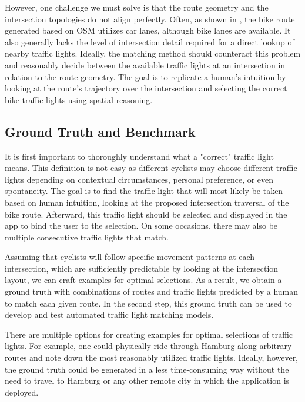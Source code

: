 However, one challenge we must solve is that the route geometry and the intersection topologies do not align perfectly. Often, as shown in , the bike route generated based on OSM utilizes car lanes, although bike lanes are available. It also generally lacks the level of intersection detail required for a direct lookup of nearby traffic lights. Ideally, the matching method should counteract this problem and reasonably decide between the available traffic lights at an intersection in relation to the route geometry. The goal is to replicate a human's intuition by looking at the route's trajectory over the intersection and selecting the correct bike traffic lights using spatial reasoning.

\subsection{Ground Truth and Benchmark}

It is first important to thoroughly understand what a "correct" traffic light means. This definition is not easy as different cyclists may choose different traffic lights depending on contextual circumstances, personal preference, or even spontaneity. The goal is to find the traffic light that will most likely be taken based on human intuition, looking at the proposed intersection traversal of the bike route. Afterward, this traffic light should be selected and displayed in the app to bind the user to the selection. On some occasions, there may also be multiple consecutive traffic lights that match.

Assuming that cyclists will follow specific movement patterns at each intersection, which are sufficiently predictable by looking at the intersection layout, we can craft examples for optimal selections. As a result, we obtain a ground truth with combinations of routes and traffic lights predicted by a human to match each given route. In the second step, this ground truth can be used to develop and test automated traffic light matching models.

There are multiple options for creating examples for optimal selections of traffic lights. For example, one could physically ride through Hamburg along arbitrary routes and note down the most reasonably utilized traffic lights. Ideally, however, the ground truth could be generated in a less time-consuming way without the need to travel to Hamburg or any other remote city in which the application is deployed. 

